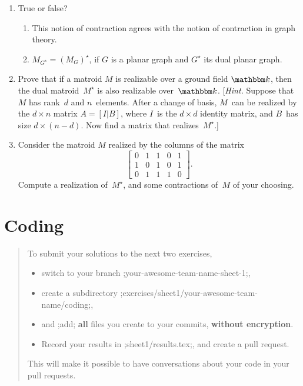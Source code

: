 \documentclass[11pt]{amsart}
\newcommand{\alert}[1]{\textbf{\color{red}#1}}
\begin{document}
\bigskip
\begin{enumerate}
\item True or false?
  \begin{enumerate}
  \item This notion of contraction agrees with the notion of
    contraction in graph theory.
  \item $M_{G^\star} = (M_G)^\star$, if $G$ is a planar graph and $G^\star$ its dual planar graph.
  \end{enumerate}
  
  \bigskip
\item Prove that if a matroid $M$ is realizable over a ground field $\mathbbm k$, then the dual matroid~$M^\star$ is also realizable over~$\mathbbm k$.
  {\footnotesize\color{green!30!black} [\emph{Hint.} Suppose that $M$ has rank~$d$ and $n$~elements.
  After a change of basis, $M$~can be realized by the $d\times n$ matrix $A=[I|B]$, where $I$~is the $d\times d$ identity matrix, and $B$~has size $d\times(n-d)$.
  Now find a matrix that realizes~$M^\star$.]
}

\bigskip
\item
  Consider the matroid $M$ realized by the columns of the matrix
  \[
    \begin{bmatrix}
      0 & 1 & 1 & 0 & 1 \\
      1 & 0 & 1 & 0 & 1 \\
      0 & 1 & 1 & 1 & 0
    \end{bmatrix}.
  \]
  Compute a realization of~$M^\star$, and some contractions of~$M$ of your choosing.

\end{enumerate}

\section*{Coding}

\begin{quote}\small
  To submit your solutions to the next two exercises,
  \begin{itemize}[$\quad\triangleright$]
  \item switch to your branch ;your-awesome-team-name-sheet-1;,
  \item create a subdirectory ;exercises/sheet1/your-awesome-team-name/coding;,
  \item and ;add; \alert{all} files you create to your commits, \alert{without encryption}.
  \item Record your results in ;sheet1/results.tex;, and create a pull request.
  \end{itemize}
  This will make it possible to have conversations about your code in your pull requests.
\end{quote}
\end{document}
